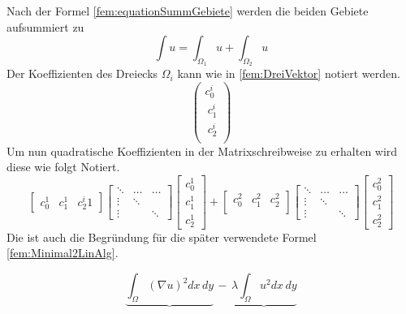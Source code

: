 Nach der Formel \eqref{fem:equationSummGebiete} werden die beiden Gebiete aufsummiert zu
\begin{equation}
	\int u = \int_{\Omega_1} u + \int_{\Omega_2} u 
\end{equation}
Der Koeffizienten des Dreiecks $\Omega_i$ kann wie in \eqref{fem:DreiVektor} notiert werden.
\begin{equation}
	\left( \begin{array}{c} c_0^i \\\ c_1^i \\\ c_2^i \\\ \end{array}\right)
	\label{fem:DreiVektor}
\end{equation}
Um nun quadratische Koeffizienten in der Matrixschreibweise zu erhalten wird diese wie folgt Notiert.
\begin{equation}
\begin{bmatrix}
c_0^1 &  c_1^1 &  c_2^i1  
\end{bmatrix}
\begin{bmatrix}
\ddots & \dots &  \dots    \\
\vdots & \ddots &   \\
\vdots &  & \ddots
\end{bmatrix}
\begin{bmatrix}
c_0^1  \\
c_1^1 \\
c_2^1
\end{bmatrix}
+
\begin{bmatrix}
c_0^2 &  c_1^2 &  c_2^2    \\   
\end{bmatrix}
\begin{bmatrix}
\ddots & \dots &  \dots    \\
\vdots & \ddots &   \\
\vdots &  & \ddots
\end{bmatrix}
\begin{bmatrix}
c_0^2  \\
c_1^2 \\
c_2^2
\end{bmatrix}
	\label{fem:MatrixKoeffizient}
\end{equation}
Die ist auch die Begründung für die später verwendete Formel \eqref{fem:Minimal2LinAlg}.

\begin{equation}
			\underbrace{ \int_{\Omega} (\nabla u)^2 dx \, dy} \, -  \, \underbrace{\lambda \int_{\Omega} u^2 dx \,dy}
			\label{fem:Minimal2TermLinAlg}
\end{equation}


